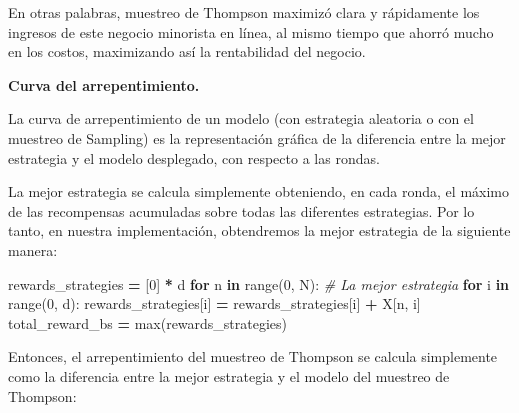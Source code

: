 \documentclass[]{book}
\newenvironment{Shaded}{\begin{snugshade}}{\end{snugshade}}
\newcommand{\BuiltInTok}[1]{#1}
\newcommand{\CommentTok}[1]{\textcolor[rgb]{0.56,0.35,0.01}{\textit{#1}}}
\newcommand{\ControlFlowTok}[1]{\textcolor[rgb]{0.13,0.29,0.53}{\textbf{#1}}}
\newcommand{\DecValTok}[1]{\textcolor[rgb]{0.00,0.00,0.81}{#1}}
\newcommand{\KeywordTok}[1]{\textcolor[rgb]{0.13,0.29,0.53}{\textbf{#1}}}
\newcommand{\NormalTok}[1]{#1}
\newcommand{\OperatorTok}[1]{\textcolor[rgb]{0.81,0.36,0.00}{\textbf{#1}}}
\begin{document}
En otras palabras, muestreo de Thompson maximizó clara y rápidamente los ingresos de este negocio minorista en línea, al mismo tiempo que ahorró mucho en los costos, maximizando así la rentabilidad del negocio.

\textbf{Curva del arrepentimiento.}

La curva de arrepentimiento de un modelo (con estrategia aleatoria o con el muestreo de Sampling) es la representación gráfica de la diferencia entre la mejor estrategia y el modelo desplegado, con respecto a las rondas.

La mejor estrategia se calcula simplemente obteniendo, en cada ronda, el máximo de las recompensas acumuladas sobre todas las diferentes estrategias. Por lo tanto, en nuestra implementación, obtendremos la mejor estrategia de la siguiente manera:

\begin{Shaded}
\begin{Highlighting}[]
\NormalTok{rewards_strategies }\OperatorTok{=}\NormalTok{ [}\DecValTok{0}\NormalTok{] }\OperatorTok{*}\NormalTok{ d}
\ControlFlowTok{for}\NormalTok{ n }\KeywordTok{in} \BuiltInTok{range}\NormalTok{(}\DecValTok{0}\NormalTok{, N):}
    \CommentTok{# La mejor estrategia}
    \ControlFlowTok{for}\NormalTok{ i }\KeywordTok{in} \BuiltInTok{range}\NormalTok{(}\DecValTok{0}\NormalTok{, d):}
\NormalTok{        rewards_strategies[i] }\OperatorTok{=}\NormalTok{ rewards_strategies[i] }\OperatorTok{+}\NormalTok{ X[n, i]}
\NormalTok{    total_reward_bs }\OperatorTok{=} \BuiltInTok{max}\NormalTok{(rewards_strategies)}
\end{Highlighting}
\end{Shaded}

Entonces, el arrepentimiento del muestreo de Thompson se calcula simplemente como la diferencia entre la mejor estrategia y el modelo del muestreo de Thompson:
\end{document}
